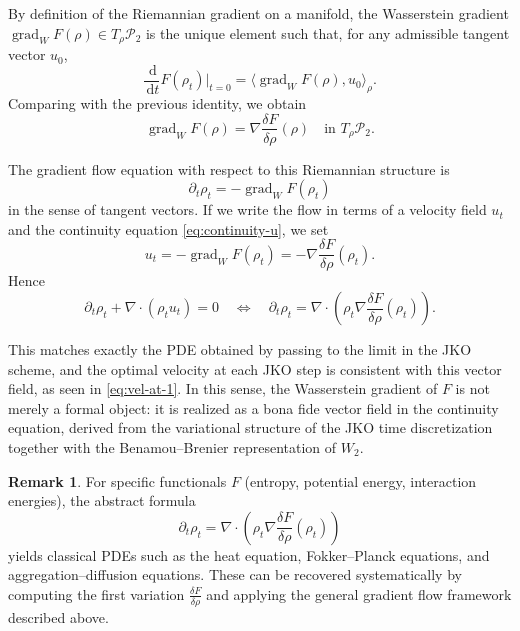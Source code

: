\documentclass[11pt]{article}
\numberwithin{equation}{section}
\theoremstyle{definition}
\newtheorem{remark}{Remark}[section]
\newcommand{\Ptwo}{\mathcal{P}_2}
\newcommand{\dd}{\,\mathrm{d}}
\begin{document}
By definition of the Riemannian gradient on a manifold, the Wasserstein gradient $\operatorname{grad}_W F(\rho) \in T_\rho\Ptwo$ is the unique element such that, for any admissible tangent vector $u_0$,
\[
\frac{\dd}{\dd t}F(\rho_t)\bigg|_{t=0}
= \langle \operatorname{grad}_W F(\rho), u_0\rangle_{\rho}.
\]
Comparing with the previous identity, we obtain
\begin{equation}
\label{eq:gradWF}
\operatorname{grad}_W F(\rho) = \nabla\frac{\delta F}{\delta \rho}(\rho)
\quad\text{in }T_{\rho}\Ptwo.
\end{equation}

The gradient flow equation with respect to this Riemannian structure is
\[
\partial_t \rho_t
= -\operatorname{grad}_W F(\rho_t)
\]
in the sense of tangent vectors. If we write the flow in terms of a velocity field $u_t$ and the continuity equation \eqref{eq:continuity-u}, we set
\[
u_t = -\operatorname{grad}_W F(\rho_t)
= -\nabla\frac{\delta F}{\delta \rho}(\rho_t).
\]
Hence
\[
\partial_t \rho_t + \nabla\cdot(\rho_t u_t) = 0
\quad\Longleftrightarrow\quad
\partial_t \rho_t
= \nabla\cdot\left(\rho_t \nabla\frac{\delta F}{\delta \rho}(\rho_t)\right).
\]

This matches exactly the PDE obtained by passing to the limit in the JKO scheme, and the optimal velocity at each JKO step is consistent with this vector field, as seen in \eqref{eq:vel-at-1}. In this sense, the Wasserstein gradient of $F$ is not merely a formal object: it is realized as a bona fide vector field in the continuity equation, derived from the variational structure of the JKO time discretization together with the Benamou--Brenier representation of $W_2$.

\begin{remark}
For specific functionals $F$ (entropy, potential energy, interaction energies), the abstract formula
\[
\partial_t \rho_t
= \nabla\cdot\left(\rho_t \nabla\frac{\delta F}{\delta \rho}(\rho_t)\right)
\]
yields classical PDEs such as the heat equation, Fokker--Planck equations, and aggregation--diffusion equations. These can be recovered systematically by computing the first variation $\frac{\delta F}{\delta \rho}$ and applying the general gradient flow framework described above.
\end{remark}
\end{document}
